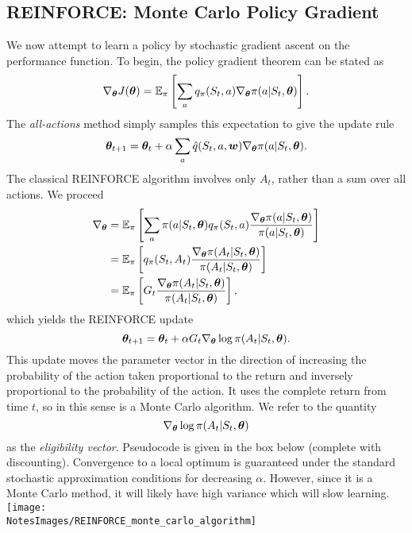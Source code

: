 \subsection{REINFORCE: Monte Carlo Policy Gradient}
We now attempt to learn a policy by stochastic gradient ascent on the performance function. To begin, the policy gradient theorem can be stated as 
\[
    \nabla_{\boldsymbol{\theta}}J(\boldsymbol{\theta}) = \mathbb{E}_{\pi} \left[\sum_a q_\pi(S_t, a) \nabla_{\boldsymbol{\theta}}\pi(a \vert{} S_t, \boldsymbol{\theta}) \right].
\]
The \emph{all-actions} method simply samples this expectation to give the update rule
\[
    \boldsymbol{\theta}_{t+1} = \boldsymbol{\theta}_t + \alpha \sum_a \hat{q}(S_t, a, \boldsymbol{w})\nabla_{\boldsymbol{\theta}}\pi(a\vert{}S_t, \boldsymbol{\theta}).
\]
The classical REINFORCE algorithm involves only $A_t$, rather than a sum over all actions. We proceed
\begin{align}
    \nabla_{\boldsymbol{\theta}} &= \mathbb{E}_{\pi}\left[ \sum_a \pi(a\vert{}S_t, \boldsymbol{\theta}) q_\pi(S_t, a)\frac{\nabla_{\boldsymbol{\theta}}\pi(a \vert{} S_t, \boldsymbol{\theta})}{\pi(a \vert{} S_t, \boldsymbol{\theta})} \right] \\
  &= \mathbb{E}_{\pi}\left[q_\pi(S_t, A_t)\frac{\nabla_{\boldsymbol{\theta}}\pi(A_t \vert{} S_t, \boldsymbol{\theta})}{\pi(A_t \vert{} S_t, \boldsymbol{\theta})} \right] \\
  &= \mathbb{E}_{\pi}\left[G_t\frac{\nabla_{\boldsymbol{\theta}}\pi(A_t \vert{} S_t, \boldsymbol{\theta})}{\pi(A_t \vert{} S_t, \boldsymbol{\theta})} \right],
\end{align}
which yields the REINFORCE update
\begin{equation}
    \boldsymbol{\theta}_{t+1} = \boldsymbol{\theta}_t + \alpha G_t \nabla_{\boldsymbol{\theta}} \log\pi(A_t\vert{} S_t, \boldsymbol{\theta}).
\end{equation}
This update moves the parameter vector in the direction of increasing the probability of the action taken proportional to the return and inversely proportional to the probability of the action. It uses the complete return from time $t$, so in this sense is a Monte Carlo algorithm. We refer to the quantity
\[
    \nabla_{\boldsymbol{\theta}} \log\pi(A_t\vert{} S_t, \boldsymbol{\theta})
\]
as the \emph{eligibility vector}. Pseudocode is given in the box below (complete with discounting). Convergence to a local optimum is guaranteed under the standard stochastic approximation conditions for decreasing $\alpha$. However, since it is a Monte Carlo method, it will likely have high variance which will slow learning.\\

\texttt{[image: \\NotesImages/REINFORCE\_monte\_carlo\_algorithm]}\\

